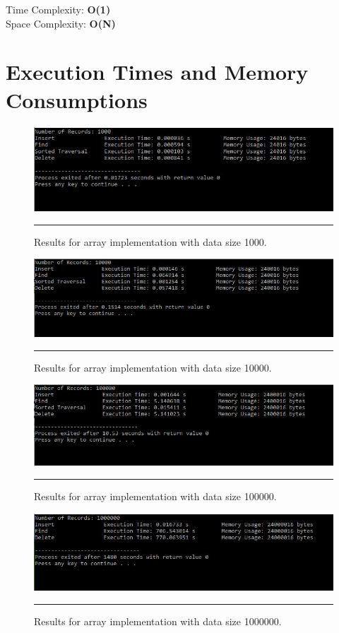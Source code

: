 Time Complexity: \textbf{O(1)} \\
Space Complexity: \textbf{O(N)}


\section{Execution Times and Memory Consumptions}
\begin{figure}[H]
	\centering
	\includegraphics[scale =0.7]{./Figures/Array1000.jpg}
	\rule{35em}{0.5pt}
	\caption{Results for array implementation with data size 1000.}
	\label{fig:Array 1000}
\end{figure}

\begin{figure}[H]
	\centering
	\includegraphics[scale =0.7]{./Figures/Array10000.jpg}
	\rule{35em}{0.5pt}
	\caption{Results for array implementation with data size 10000.}
	\label{fig:Array 10000}
\end{figure}

\begin{figure}[H]
	\centering
	\includegraphics[scale =0.7]{./Figures/Array100000.jpg}
	\rule{35em}{0.5pt}
	\caption{Results for array implementation with data size 100000.}
	\label{fig:Array 100000}
\end{figure}

\begin{figure}[H]
	\centering
	\includegraphics[scale =0.7]{./Figures/Array1000000.jpg}
	\rule{35em}{0.5pt}
	\caption{Results for array implementation with data size 1000000.}
	\label{fig:Array 1000000}
\end{figure}
